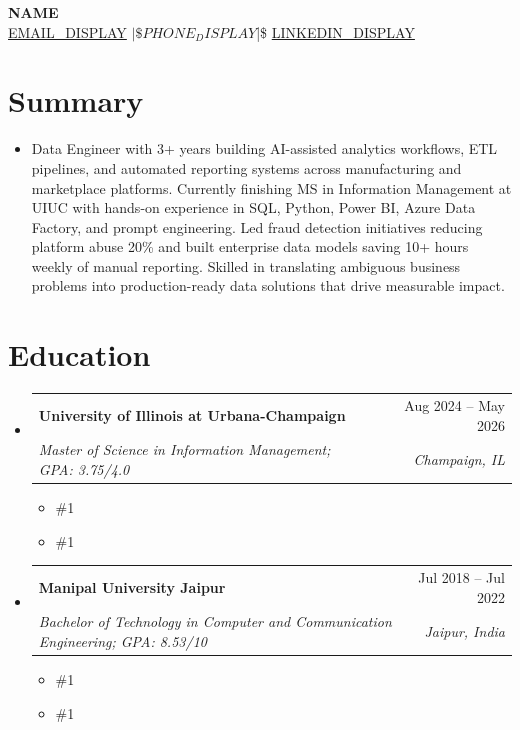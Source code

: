 \documentclass[letterpaper,11pt]{article}
\makeatletter
\newcommand{\resumeSubheading}[4]{
  \vspace{0pt}\item
    \begin{tabular*}{\textwidth}{l@{\extracolsep{\fill}}r}
      \textbf{#1} & #2 \\
      \textit{#3} & \textit{#4} \\ 
    \end{tabular*}\vspace{-6pt}
}
\newcommand{\resumeEducationCoursework}[1]{
  \vspace{-9pt} 
  \begin{itemize}[leftmargin=0pt, label={}]
    \item {\#1}
  \end{itemize}
}
\newcommand{\resumeEducationCertifications}[1]{
  \vspace{-15pt} 
  \begin{itemize}[leftmargin=0pt, label={}]
    \item {\#1}
  \end{itemize}
}
\newcommand{\resumeSubHeadingListStart}{\begin{itemize}[leftmargin=0pt,label={},itemsep=-2pt]}
\newcommand{\resumeSubHeadingListEnd}{\end{itemize}}
\makeatother
\begin{document}
\justifying

\begin{center}
    \textbf{\LARGE {{NAME}}} \\ \vspace{5pt}
    \href{mailto:{{EMAIL_URL}}}{{EMAIL_DISPLAY}} $|\$ {{PHONE_DISPLAY}} $|\$ \href{%
      {{LINKEDIN_URL}}%
    }{%
      {{LINKEDIN_DISPLAY}}%
    }
\end{center}

\section{Summary}
\begin{itemize}[leftmargin=0pt, label={}]
  \item { Data Engineer with 3+ years building AI-assisted analytics workflows, ETL pipelines, and automated reporting systems across manufacturing and marketplace platforms. Currently finishing MS in Information Management at UIUC with hands-on experience in SQL, Python, Power BI, Azure Data Factory, and prompt engineering. Led fraud detection initiatives reducing platform abuse 20\% and built enterprise data models saving 10+ hours weekly of manual reporting. Skilled in translating ambiguous business problems into production-ready data solutions that drive measurable impact. }
\end{itemize}

\section{Education}
  \resumeSubHeadingListStart
    \resumeSubheading
      {University of Illinois at Urbana-Champaign}{Aug 2024 -- May 2026}
      {Master of Science in Information Management; GPA: 3.75/4.0}{Champaign, IL}
    \resumeEducationCoursework{
      \textbf{Relevant Coursework:} Applied Machine Learning, Cloud Computing Applications, Data Mining, Data Warehousing and Business Intelligence, Information Modeling, Data Visualization, Data and Statistical Models
    }
    \resumeEducationCertifications{
      \textbf{Certifications:} Getting Started with Microsoft Azure, Cloud Computing, The Complete Prompt Engineering for AI Bootcamp
    }
    
    \resumeSubheading
      {Manipal University Jaipur}{Jul 2018 -- Jul 2022}
      {Bachelor of Technology in Computer and Communication Engineering; GPA: 8.53/10}{Jaipur, India}
    \resumeEducationCoursework{
      \textbf{Relevant Coursework:} Data Structures and Algorithms, Relational Database Management Systems, Operating Systems, Computer Networks, Software Testing, Cryptography and Security
    }
    \resumeEducationCertifications{
      \textbf{Certifications:} Google Project Management Specialization, Certified Ethical Hacker (EC-Council), Networking in Google Cloud, Architecting with Google Kubernetes Engine
    }
  \resumeSubHeadingListEnd
\end{document}
